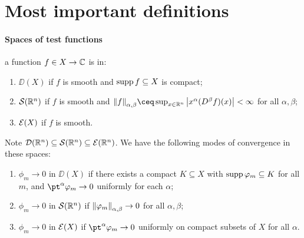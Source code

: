 \setcounter{section}{-1}
\section{Most important definitions}
\paragraph{Spaces of test functions} a function $f \in X \to \mathbb C$ is in: 
\begin{enumerate}
	\itemsep=0em
	\item $\DD(X)$ if $f$ is smooth and $\operatorname{supp} f \subseteq X$ is compact;
	\item $\mathcal S(\mathbb R^n)$ if $f$ is smooth and $\norm{f}_{\alpha, \beta} \ceq \sup_{x \in \RR^n} \abs{x^\alpha (D^\beta f)(x)} < \infty$ for all $\alpha, \beta$;
	\item $\mathcal E(X)$ if $f$ is smooth. 
\end{enumerate}
Note $\mathcal D(\mathbb R^n) \subseteq \mathcal S(\mathbb R^n) \subseteq \mathcal E(\mathbb R^n)$. 
We have the following modes of convergence in these spaces:
\begin{enumerate}
	\itemsep=0em
	\item $\phi_m \to0$ in $\DD(X)$ if there exists a compact $K \subseteq X$ with $\operatorname{supp}\varphi_m \subseteq K$ for all $m$, and $\pt^\alpha \phi_m \to 0$ uniformly for each $\alpha$;
	\item $\phi_m \to0$ in $\mathcal S(\mathbb R^n)$ if $\norm{\varphi_m}_{\alpha, \beta} \to 0$ for all $\alpha, \beta$;
	\item $\phi_m \to0$ in $\mathcal E(X)$ if $\pt^\alpha \phi_m \to 0$ uniformly on compact subsets of $X$ for all $\alpha$. 
\end{enumerate}

